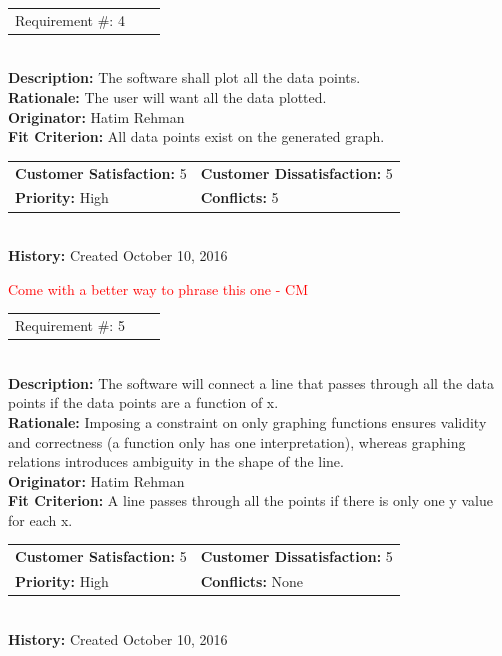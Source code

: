 \documentclass[12pt, titlepage]{article}
\begin{document}
\begin{reqbox}
\begin{tabular}{ccc}Requirement \#: 4
\end{tabular} \\
\textbf{Description:} The software shall plot all the data points.\\
\textbf{Rationale:} The user will want all the data plotted. \\
\textbf{Originator:} Hatim Rehman \\
\textbf{Fit Criterion:} All data points exist on the generated graph.\\
\begin{tabular}{ll}
\textbf{Customer Satisfaction:} 5 & \textbf{Customer Dissatisfaction:} 5 \\
\textbf{Priority:} High & \textbf{Conflicts:} 5\\
\end{tabular} \\
\textbf{History:} Created October 10, 2016
\end{reqbox}
\textcolor{red}{Come with a better way to phrase this one - CM} \\
\begin{reqbox}
\begin{tabular}{ccc}Requirement \#: 5
\end{tabular} \\
\textbf{Description:} The software will connect a line that passes through all the data points if the data points are a function of x.\\
\textbf{Rationale:} Imposing a constraint on only graphing functions ensures validity and correctness (a function only has one interpretation), whereas graphing relations introduces ambiguity in the shape of the line. \\
\textbf{Originator:} Hatim Rehman \\
\textbf{Fit Criterion:} A line passes through all the points if there is only one y value for each x.\\
\begin{tabular}{ll}
\textbf{Customer Satisfaction:} 5 & \textbf{Customer Dissatisfaction:} 5 \\
\textbf{Priority:} High & \textbf{Conflicts:} None\\
\end{tabular} \\
\textbf{History:} Created October 10, 2016
\end{reqbox}
\clearpage
\end{document}
